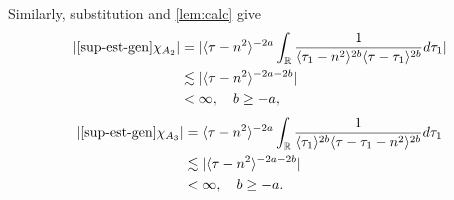 \documentclass[12pt,reqno]{amsart}
\numberwithin{equation}{section}  %
\numberwithin{figure}{section}
\newcommand{\rr}{\mathbb{R}}
\newcommand{\zz}{\mathbb{Z}}
\theoremstyle{plain}
\theoremstyle{definition}
\theoremstyle{remark}
\begin{document}

%
%
Similarly, substitution and \autoref{lem:calc} give
%
%
\begin{equation}
\begin{split}
  |  \eqref{sup-est-gen} \chi_{A_{2}}|
  & = | \langle \tau -n^{2} \rangle ^{-2a}\int_{\rr} \frac{1}{\langle \tau_{1} -
  n^{2} \rangle ^{2b}\langle
  \tau - \tau_{1}\rangle ^{2b}}d \tau_{1} |
  \\
  & \lesssim |  \langle \tau - n^{2} \rangle ^{-2a-2b} |
  \\
  & < \infty, \quad b \ge -a,
\end{split}
\end{equation}
%
%
%
%
\begin{equation}
\begin{split}
  |  \eqref{sup-est-gen} \chi_{A_{3}}|
  & = \langle \tau - n^{2} \rangle ^{-2a}
  \int_{\rr} \frac{1}{ \langle \tau_{1} \rangle^{2b}  \langle \tau -
  \tau_{1} - n^{2} \rangle^{2b}}
d \tau_1 
\\
  & \lesssim |  \langle \tau - n^{2} \rangle ^{-2a-2b} |
  \\
  & < \infty, \quad b \ge -a.
	\end{split}
\end{equation}
\end{document}
